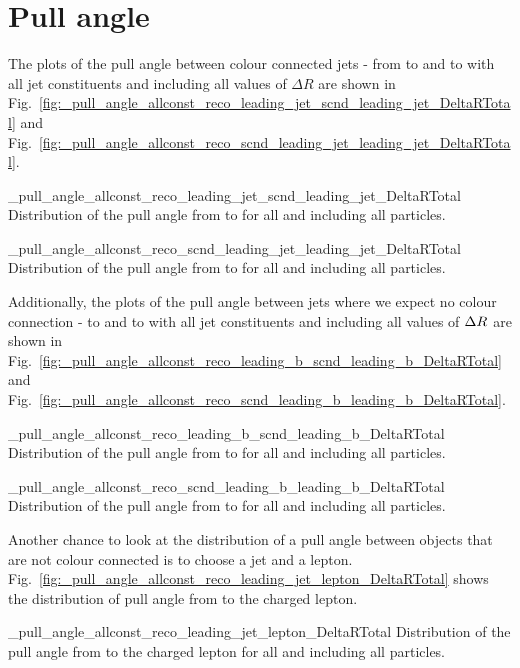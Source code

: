 \section{Pull angle}

The plots of the pull angle between colour connected jets - from \leadingjet to \scndleadingjet and \scndleadingjet to \leadingjet with all jet constituents and including all values of $\Delta R$ are shown in Fig.~\ref{fig:_pull_angle_allconst_reco_leading_jet_scnd_leading_jet_DeltaRTotal} and Fig.~\ref{fig:_pull_angle_allconst_reco_scnd_leading_jet_leading_jet_DeltaRTotal}.

          {_pull_angle_allconst_reco_leading_jet_scnd_leading_jet_DeltaRTotal}
          {Distribution of the pull angle from \leadingjet to \scndleadingjet for all \DeltaR and including all particles.}

          {_pull_angle_allconst_reco_scnd_leading_jet_leading_jet_DeltaRTotal}
          {Distribution of the pull angle from \scndleadingjet to \leadingjet for all \DeltaR and including all particles.}

Additionally, the plots of the pull angle between jets where we expect no colour connection - \leadingb to \scndleadingb and \scndleadingb to \leadingb with all jet constituents and including all values of $\Delta R^{} $ are shown in Fig.~\ref{fig:_pull_angle_allconst_reco_leading_b_scnd_leading_b_DeltaRTotal} and Fig.~\ref{fig:_pull_angle_allconst_reco_scnd_leading_b_leading_b_DeltaRTotal}.

          {_pull_angle_allconst_reco_leading_b_scnd_leading_b_DeltaRTotal}
          {Distribution of the pull angle from \leadingb to \scndleadingb for all \DeltaR and including all particles.}

          {_pull_angle_allconst_reco_scnd_leading_b_leading_b_DeltaRTotal}
          {Distribution of the pull angle from \scndleadingb to \leadingb for all \DeltaR and including all particles.}

Another chance to look at the distribution of a pull angle between objects that are not colour connected is to choose a jet and a lepton. Fig.~\ref{fig:_pull_angle_allconst_reco_leading_jet_lepton_DeltaRTotal} shows the distribution of pull angle from \leadingjet to the charged lepton. 

          {_pull_angle_allconst_reco_leading_jet_lepton_DeltaRTotal}
          {Distribution of the pull angle from \leadingjet to the charged lepton for all \DeltaR and including all particles.}

